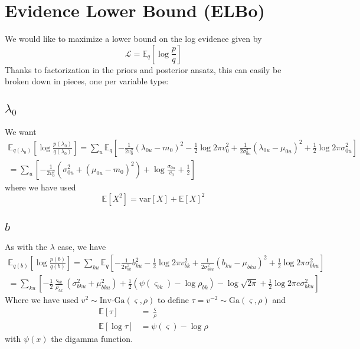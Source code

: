 \documentclass[11pt]{article}
\begin{document}
\section{Evidence Lower Bound (ELBo)}
We would like to maximize a lower bound on the log evidence given by
\begin{equation}
    \mathcal{L} = \mathbb{E}_q \left[ \log \frac{p}{q} \right]
\end{equation}
Thanks to factorization in the priors and posterior ansatz, this can easily be broken down in pieces, one per variable type:

\subsection{$\lambda_0$}
We want
\begin{multline}
    \mathbb{E}_{q(\lambda_0)}\left[ \log \frac{p(\lambda_0)}{q(\lambda_0)}\right] = \sum_u \mathbb{E}_q\left[ -\frac{1}{2v_0^2} (\lambda_{0u} - m_0)^2
    - \frac{1}{2}\log 2\pi v_0^2
    + \frac{1}{2\sigma_{0u}^2} (\lambda_{0u} - \mu_{0u})^2
    + \frac{1}{2}\log 2\pi \sigma^2_{0u}
    \right] \\
    = \sum_u \left[
    -\frac{1}{2v_0^2} \left(\sigma^2_{0u} + (\mu_{0u} - m_0)^2 \right)
    + \log \frac{\sigma_{0u}}{v_0} + \frac{1}{2}
    \right]
\end{multline}
where we have used
\begin{equation}
    \mathbb{E}[X^2] = \mathrm{var}[X] + \mathbb{E}[X]^2
\end{equation}

\subsection{$b$}
As with the $\lambda$ case, we have
\begin{multline}
    \mathbb{E}_{q(b)}\left[ \log \frac{p(b)}{q(b)}\right] = \sum_{ku} \mathbb{E}_q\left[ -\frac{1}{2v_{bk}^2} b_{ku}^2
    - \frac{1}{2}\log 2\pi v_{bk}^2
    + \frac{1}{2\sigma_{bku}^2} (b_{ku} - \mu_{bku})^2
    + \frac{1}{2}\log 2\pi \sigma^2_{bku}
    \right] \\
    = \sum_{ku} \left[
    -\frac{1}{2}\frac{\varsigma_{bk}}{\rho_{bk}}\left(\sigma^2_{bku} + \mu^2_{bku} \right)
    + \frac{1}{2}(\psi(\varsigma_{bk}) - \log \rho_{bk}) - \log \sqrt{2\pi} + \frac{1}{2} \log 2\pi e \sigma^2_{bku}
    \right]
\end{multline}
Where we have used $v^2 \sim \text{Inv-Ga}(\varsigma, \rho)$ to define $\tau = v^{-2} \sim \mathrm{Ga}(\varsigma, \rho)$ and
\begin{align}
    \mathbb{E}[\tau] &= \frac{\varsigma}{\rho} \\
    \mathbb{E}[\log \tau] &= \psi(\varsigma) - \log \rho
\end{align}
with $\psi(x)$ the digamma function.
\end{document}
